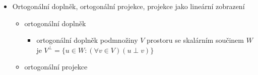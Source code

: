 \begin{itemize}
\begin{itemize}
\item ortonormální báze
\begin{itemize}
\item bázi $Z=\lbrace v_1,\dots,v_n \rbrace$ prostoru $V$ se skalárním součinem nazveme ortonormální, pokud platí $v_i\perp v_j$ pro každé $i\neq j$ a také $\|v_i\|=1$ pro každé $v_i\in Z$
\item pozorování: matice, jejichž sloupce tvoří vektory ortonormální báze $\mathbb C^n$ vzhledem ke std. skal. součinu, splňují $A^HA=I_n\implies$ jsou unitární
\end{itemize}
\item Fourierovy koeficienty
\begin{itemize}
\item nechť $Z=\lbrace v_1,\dots,v_n\rbrace$ je ortonormální báze prostoru $V$
\item tvrzení: pro každé $u\in V$ platí $u=\langle u|v_1\rangle v_1+\dots+\langle u|v_n\rangle v_n$
\item $\langle u|v_i\rangle$ \dots{} Fourierovy koeficienty
\end{itemize}
\item algoritmus GS ortogonalizace
\begin{itemize}
\item převede libovolnou bázi $(u_1,\dots,u_n)$ prostoru $V$ se skalárním součinem na ortonormální bázi $(v_1,\dots,v_n)$
\item for $i=1,\dots,n$ do
\begin{itemize}
\item $w_i\leftarrow u_i-\sum^{i-1}_{j=1}\langle u_i|v_j\rangle v_j$
\item $v_i\leftarrow \frac1{\|w_i\|}w_i$
\end{itemize}
\item end
\end{itemize}
\end{itemize}
\item Ortogonální doplněk, ortogonální projekce, projekce jako lineární zobrazení
\begin{itemize}
\item ortogonální doplněk
\begin{itemize}
\item ortogonální doplněk podmnožiny $V$ prostoru se skalárním součinem $W$ je $V^\perp=\lbrace u\in W:(\forall v\in V)(u\perp v)\rbrace$
\end{itemize}
\item ortogonální projekce
\begin{itemize}

\end{itemize}
\end{itemize}
\end{itemize}
